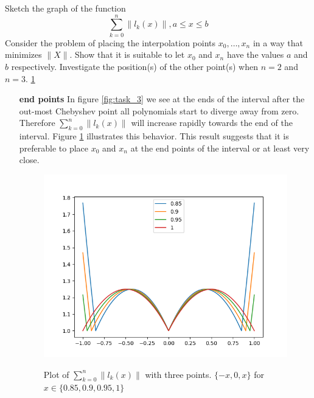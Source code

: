 \newpage

\begin{problem}
  Sketch the graph of the function
  \begin{equation*}
    \sum_{k=0}^n\|l_k(x)\|, a \leq x \leq b
  \end{equation*}
  Consider the problem of placing the interpolation points ${x_0,
    \dots, x_n }$ in a way that minimizes $\|X\|$. Show that it is
  suitable to let $x_0$ and $x_n$ have the values $a$ and $b$
  respectively. Investigate the position(s) of the other point(s) when
  $n = 2$ and $n = 3$. \ref{fig:task_4_edge}
\end{problem}


\begin{solution}
  \begin{enumerate}
    \item[{\bf end points}]In figure \ref{fig:task_3} we see at the ends of
      the interval after the out-most Chebyshev point all polynomials
      start to diverge away from zero. Therefore
      $\sum_{k=0}^n\|l_k(x)\|$ will increase rapidly towards the end
      of the interval. Figure \ref{fig:task_4_edge} illustrates this
      behavior. This result suggests that it is preferable to place
      $x_0$ and $x_n$ at the end points of the interval or at least
      very close.

\begin{figure}[!ht]
  \centering
  \includegraphics[scale = 0.5]{code/task_4_edge.png}
  \label{fig:task_4_edge}
  \caption{Plot of $\sum_{k=0}^n\|l_k(x)\|$ with three points. $\{-x,
      0, x\}$ for $x \in \{0.85, 0.9, 0.95, 1\}$}
\end{figure}


\end{enumerate}
\end{solution}
